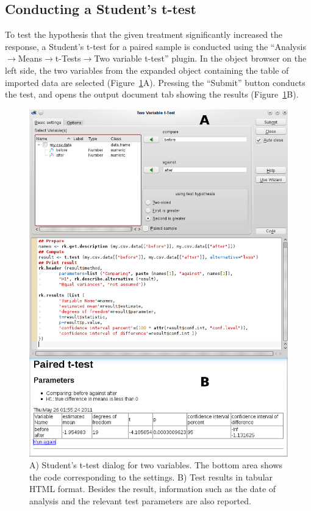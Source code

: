\subsection{Conducting a Student's t-test}
\label{sec:conducting_ttest}
To test the hypothesis that the given treatment significantly increased the response, a Student's
t-test for a paired sample is conducted using the 
``Analysis$\rightarrow$Means$\rightarrow$t-Tests$\rightarrow$Two variable t-test'' plugin. 
In the object browser on the left side, the two variables from the expanded
 object containing the table of imported data 
are selected (Figure~\ref{fig:t_test}A). 
Pressing the ``Submit'' button conducts the test, and opens the output document tab
showing the results (Figure~\ref{fig:t_test}B).


\begin{figure}[b!]
 \centering
 \includegraphics[width=14cm]{./figures/t-test2.png}
 \caption{A) Student's t-test dialog for two variables. The bottom area shows the  code corresponding to the settings. 
  B) Test results in tabular HTML format. 
Besides the result, information such as the date of analysis and the relevant test parameters are also reported.}
 \label{fig:t_test}
\end{figure}

